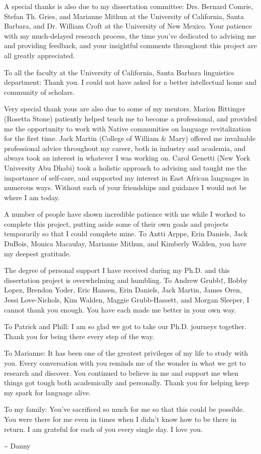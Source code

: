 A special thanks is also due to my dissertation committee: Drs. Bernard Comrie, Stefan Th. Gries, and Marianne Mithun at the University of California, Santa Barbara, and Dr. William Croft at the University of New Mexico. Your patience with my much-delayed research process, the time you've dedicated to advising me and providing feedback, and your insightful comments throughout this project are all greatly appreciated.

To all the faculty at the University of California, Santa Barbara linguistics department: Thank you. I could not have asked for a better intellectual home and community of scholars.

Very special thank yous are also due to some of my mentors. Marion Bittinger (Rosetta Stone) patiently helped teach me to become a professional, and provided me the opportunity to work with Native communities on language revitalization for the first time. Jack Martin (College of William \& Mary) offered me invaluable professional advice throughout my career, both in industry and academia, and always took an interest in whatever I was working on. Carol Genetti (New York University Abu Dhabi) took a holistic approach to advising and taught me the importance of self-care, and supported my interest in East African languages in numerous ways. Without each of your friendships and guidance I would not be where I am today.

A number of people have shown incredible patience with me while I worked to complete this project, putting aside some of their own goals and projects temporarily so that I could complete mine. To Antti Arppe, Erin Daniels, Jack DuBois, Monica Macaulay, Marianne Mithun, and Kimberly Walden, you have my deepest gratitude.

The degree of personal support I have received during my Ph.D. and this dissertation project is overwhelming and humbling. To Andrew Grubb†, Bobby Lopez, Brendon Yoder, Eric Hansen, Erin Daniels, Jack Martin, James Oren, Jessi Love-Nichols, Kim Walden, Maggie Grubb-Hassett, and Morgan Sleeper, I cannot thank you enough. You have each made me better in your own way.

To Patrick and Phill: I am so glad we got to take our Ph.D. journeys together. Thank you for being there every step of the way.

To Marianne: It has been one of the greatest privileges of my life to study with you. Every conversation with you reminds me of the wonder in what we get to research and discover. You continued to believe in me and support me when things got tough both academically and personally. Thank you for helping keep my spark for language alive.

To my family: You've sacrificed so much for me so that this could be possible. You were there for me even in times when I didn't know how to be there in return. I am grateful for each of you every single day. I love you.

\hfill\textasciitilde{ }Danny

\doublespacing
